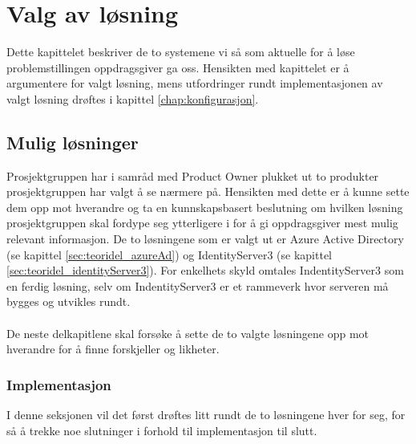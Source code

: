 \chapter{Valg av løsning}
\label{chap:valgAvLosning}
Dette kapittelet beskriver de to systemene vi så som aktuelle for å løse problemstillingen oppdragsgiver ga oss. Hensikten med kapittelet er å argumentere for valgt løsning, mens utfordringer rundt implementasjonen av valgt løsning drøftes i kapittel \ref{chap:konfigurasjon}.

\section{Mulig løsninger}
\label{sec:valgAvLosning_muligeLosninger}
Prosjektgruppen har i samråd med Product Owner plukket ut to produkter prosjektgruppen har valgt å se nærmere på. Hensikten med dette er å kunne sette dem opp mot hverandre og ta en kunnskapsbasert beslutning om hvilken løsning prosjektgruppen skal fordype seg ytterligere i for å gi oppdragsgiver mest mulig relevant informasjon. De to løsningene som er valgt ut er Azure Active Directory (se kapittel \ref{sec:teoridel_azureAd}) og IdentityServer3 (se kapittel \ref{sec:teoridel_identityServer3}). For enkelhets skyld omtales IndentityServer3 som en ferdig løsning, selv om IndentityServer3 er et rammeverk hvor serveren må bygges og utvikles rundt.
\\
\\
De neste delkapitlene skal forsøke å sette de to valgte løsningene opp mot hverandre for å finne forskjeller og likheter.

\subsection{Implementasjon}
\label{sec:valgAvLosning_muligeLosninger_implementasjon}
I denne seksjonen vil det først drøftes litt rundt de to løsningene hver for seg, for så å trekke noe slutninger i forhold til implementasjon til slutt.

